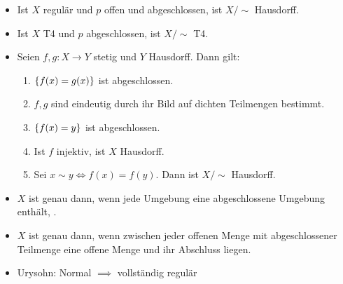 \documentclass[8pt]{extarticle}
\begin{document}
\begin{itemize}
	\item Ist $X$ regulär und $p$ offen und abgeschlossen, ist $X/\sim$ Hausdorff.
	\item Ist $X$ T4 und $p$ abgeschlossen, ist $X/\sim$ T4.
	\item Seien $f,g : X \to Y$ stetig und $Y$ Hausdorff. Dann gilt:
	\begin{enumerate}
		\item $\qty{f(x) = g(x)}$ ist abgeschlossen.
		\item $f,g$ sind eindeutig durch ihr Bild auf dichten Teilmengen bestimmt.
		\item $\qty{f(x) = y}$ ist abgeschlossen.
		\item Ist $f$ injektiv, ist $X$ Hausdorff.
		\item Sei $x \sim y \Leftrightarrow f(x) = f(y)$. Dann ist $X/\sim$ Hausdorff.
	\end{enumerate}
	\item $X$ ist  genau dann, wenn jede Umgebung eine abgeschlossene Umgebung enthält, .
	\item $X$ ist  genau dann, wenn zwischen jeder offenen Menge mit abgeschlossener Teilmenge eine offene Menge und ihr Abschluss liegen.
	\item Urysohn: Normal $\implies$ vollständig regulär
\end{itemize}
\end{document}
